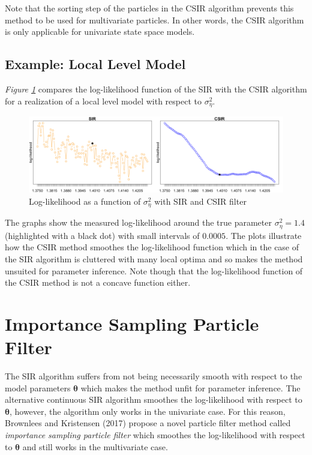 \documentclass[11pt, oneside]{scrreprt}   	%
\begin{document}
Note that the sorting step of the particles in the CSIR algorithm prevents this method to be used for multivariate particles. In other words, the CSIR algorithm is only applicable for univariate state space models.\\

\subsection{Example: Local Level Model}
\textit{Figure \ref{fig:ullm-loglik-zoom-2}} compares the log-likelihood function of the SIR with the CSIR algorithm for a realization of a local level model with respect to $\sigma_{\eta}^2$. 

\begin{figure}[h!]
\centering
\includegraphics[width=145mm]{../../images/ullm-loglik-zoom-2.png}
\caption{Log-likelihood as a function of $\sigma_{\eta}^2$ with SIR and CSIR filter}
\label{fig:ullm-loglik-zoom-2}
\end{figure}
The graphs show the measured log-likelihood around the true parameter $\sigma_{\eta}^2 = 1.4$ (highlighted with a black dot) with small intervals of $0.0005$. The plots illustrate how the CSIR method smoothes the log-likelihood function which in the case of the SIR algorithm is cluttered with many local optima and so makes the method unsuited for parameter inference. Note though that the log-likelihood function of the CSIR method is not a concave function either.

\section{Importance Sampling Particle Filter}
The SIR algorithm suffers from not being necessarily smooth with respect to the model parameters $\boldsymbol{\theta}$ which makes the method unfit for parameter inference. The alternative continuous SIR algorithm smoothes the log-likelihood with respect to $\boldsymbol{\theta}$, however, the algorithm only works in the univariate case. For this reason, Brownlees and Kristensen (2017) propose a novel particle filter method called \textit{importance sampling particle filter} which smoothes the log-likelihood with respect to $\boldsymbol{\theta}$ and still works in the multivariate case. \\
\end{document}
